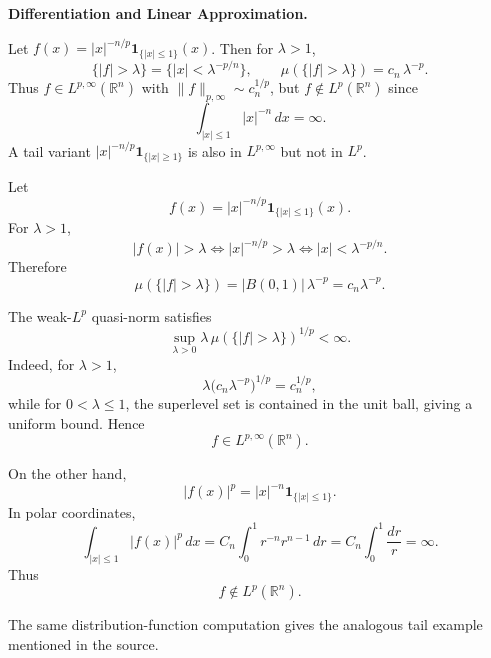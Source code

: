 \begin{problem}[CP-II-0097]
\label{prob:cp-ii-0097}
\textbf{Differentiation and Linear Approximation.}

\hspace*{1.5em}Let $f(x)=|x|^{-n/p}\mathbf{1}_{\{|x|\le 1\}}(x)$.
	Then for $\lambda>1$,
	\[
	\{|f|>\lambda\}=\{|x|<\lambda^{-p/n}\},\qquad
	\mu(\{|f|>\lambda\})=c_n\,\lambda^{-p}.
	\]
	Thus $f\in L^{p,\infty}(\mathbb{R}^n)$ with $\|f\|_{p,\infty}\sim c_n^{1/p}$,
	but $f\notin L^p(\mathbb{R}^n)$ since
	\[
	\int_{|x|\le1}|x|^{-n}\,dx=\infty.
	\]
	A tail variant $|x|^{-n/p}\mathbf{1}_{\{|x|\ge1\}}$
	is also in $L^{p,\infty}$ but not in $L^p$.
\end{problem}

\begin{solution}
Let
\[
f(x)
=
|x|^{-n/p}\mathbf1_{\{|x|\le1\}}(x).
\]
For \(\lambda>1\),
\[
|f(x)|>\lambda
\iff
|x|^{-n/p}>\lambda
\iff
|x|<\lambda^{-p/n}.
\]
Therefore
\[
\mu(\{|f|>\lambda\})
=
|B(0,1)|\,\lambda^{-p}
=
c_n\lambda^{-p}.
\]

The weak-\(L^p\) quasi-norm satisfies
\[
\sup_{\lambda>0}
\lambda\,\mu(\{|f|>\lambda\})^{1/p}
<\infty.
\]
Indeed, for \(\lambda>1\),
\[
\lambda
\bigl(c_n\lambda^{-p}\bigr)^{1/p}
=
c_n^{1/p},
\]
while for \(0<\lambda\le1\), the superlevel set is contained in the unit ball, giving a
uniform bound. Hence
\[
\boxed{
f\in L^{p,\infty}(\mathbb R^n).
}
\]

On the other hand,
\[
|f(x)|^p
=
|x|^{-n}\mathbf1_{\{|x|\le1\}}.
\]
In polar coordinates,
\[
\int_{|x|\le1}|f(x)|^p\,dx
=
C_n\int_0^1 r^{-n}r^{n-1}\,dr
=
C_n\int_0^1\frac{dr}{r}
=
\infty.
\]
Thus
\[
\boxed{f\notin L^p(\mathbb R^n).}
\]

The same distribution-function computation gives the analogous tail example mentioned in the
source.
\end{solution}


